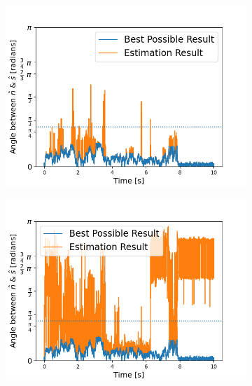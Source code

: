 \documentclass[final,  3p]{elsarticle}
\begin{document}
\begin{figure}[h]
\centering
\begin{subfigure}{0.32\textwidth}
	\subcaption{}
	\includegraphics[width=\textwidth]{./Images/fig6a.png}
\end{subfigure}
\begin{subfigure}{0.32\textwidth}
	\subcaption{}
	\includegraphics[width=\textwidth]{./Images/fig6b.png}
\end{subfigure}
\begin{subfigure}{0.32\textwidth}
	\subcaption{}

\end{subfigure}
\end{figure}
\end{document}
